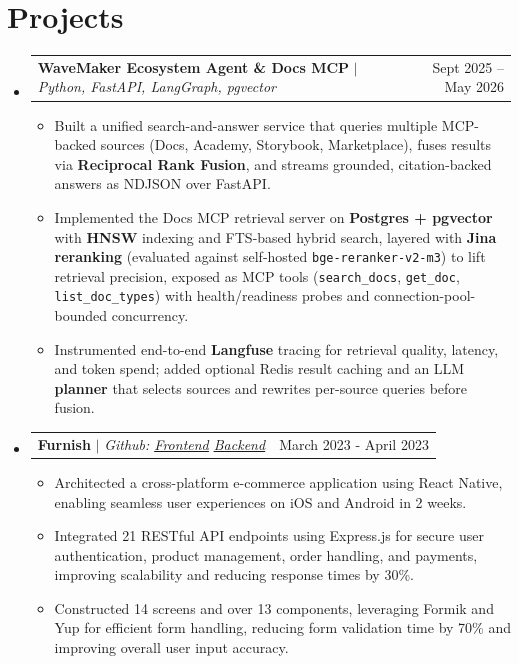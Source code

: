 \documentclass[letterpaper,11pt]{article}
\makeatletter
\newcommand{\resumeItem}[1]{\item\small{{#1 \vspace{-2pt}}}}
\newcommand{\resumeProjectHeading}[2]{
    \item
    \begin{tabular*}{0.97\textwidth}{l@{\extracolsep{\fill}}r}
      \small#1 & #2 \\
    \end{tabular*}\vspace{-7pt}
}
\newcommand{\resumeSubHeadingListStart}{\begin{itemize}[leftmargin=0.15in, label={}]}
\newcommand{\resumeSubHeadingListEnd}{\end{itemize}}
\newcommand{\resumeItemListStart}{\begin{itemize}}
\newcommand{\resumeItemListEnd}{\end{itemize}\vspace{-5pt}}
\makeatother
\begin{document}
\section{Projects}
    \resumeSubHeadingListStart
      \resumeProjectHeading
          {\textbf{WaveMaker Ecosystem Agent \& Docs MCP} $|$ \emph{Python, FastAPI, LangGraph, pgvector}}{Sept 2025 -- May 2026}
          \resumeItemListStart
            \resumeItem{Built a unified search-and-answer service that queries multiple MCP-backed sources (Docs, Academy, Storybook, Marketplace), fuses results via \textbf{Reciprocal Rank Fusion}, and streams grounded, citation-backed answers as NDJSON over FastAPI.}
            \resumeItem{Implemented the Docs MCP retrieval server on \textbf{Postgres + pgvector} with \textbf{HNSW} indexing and FTS-based hybrid search, layered with \textbf{Jina reranking} (evaluated against self-hosted \texttt{bge-reranker-v2-m3}) to lift retrieval precision, exposed as MCP tools (\texttt{search\_docs}, \texttt{get\_doc}, \texttt{list\_doc\_types}) with health/readiness probes and connection-pool-bounded concurrency.}
            \resumeItem{Instrumented end-to-end \textbf{Langfuse} tracing for retrieval quality, latency, and token spend; added optional Redis result caching and an LLM \textbf{planner} that selects sources and rewrites per-source queries before fusion.}
          \resumeItemListEnd
      \resumeProjectHeading
          {\textbf{Furnish} $|$ \emph{Github: \href{https://github.com/Tiwariji-07/React-Native-Ecommerce/}{\underline{Frontend}} \href{https://github.com/Tiwariji-07/ecommerce-backend/}{\underline{Backend}}}}{March 2023 - April 2023}
          \resumeItemListStart
            \resumeItem{Architected a cross-platform e-commerce application using React Native, enabling seamless user experiences on iOS and Android in 2 weeks.}
            \resumeItem{Integrated 21 RESTful API endpoints using Express.js for secure user authentication, product management, order handling, and payments, improving scalability and reducing response times by 30\%.}
            \resumeItem{Constructed 14 screens and over 13 components, leveraging Formik and Yup for efficient form handling, reducing form validation time by 70\% and improving overall user input accuracy.}
          \resumeItemListEnd
    \resumeSubHeadingListEnd

\end{document}
